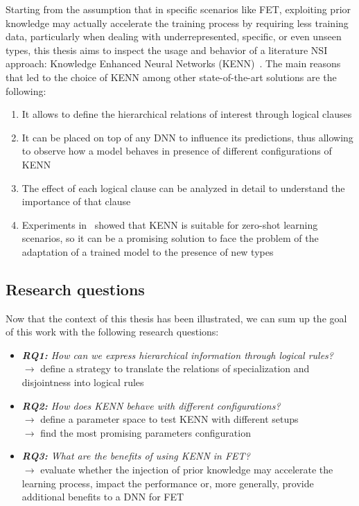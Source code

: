 Starting from the assumption that in specific scenarios like FET, exploiting prior knowledge may actually accelerate the training process by requiring less training data, particularly when dealing with underrepresented, specific, or even unseen types, this thesis aims to inspect the usage and behavior of a literature NSI approach: Knowledge Enhanced Neural Networks (KENN)~\cite{kenn}. The main reasons that led to the choice of KENN among other state-of-the-art solutions are the following:
\begin{enumerate}
    \item It allows to define the hierarchical relations of interest through logical clauses
    \item It can be placed on top of any DNN to influence its predictions, thus allowing to observe how a model behaves in presence of different configurations of KENN
    \item The effect of each logical clause can be analyzed in detail to understand the importance of that clause
    \item Experiments in~\cite{kenn, daniele2021neural} showed that KENN is suitable for zero-shot learning scenarios, so it can be a promising solution to face the problem of the adaptation of a trained model to the presence of new types
\end{enumerate}
 
\subsection{Research questions} \label{research_questions}
Now that the context of this thesis has been illustrated, we can sum up the goal of this work with the following research questions:
\begin{itemize}
    \item \textit{\textbf{RQ1: }How can we express hierarchical information through logical rules?}\\
    $\rightarrow$ define a strategy to translate the relations of specialization and disjointness into logical rules
    \item \textit{\textbf{RQ2: }How does KENN behave with different configurations?}\\
    $\rightarrow$ define a parameter space to test KENN with different setups\\
    $\rightarrow$ find the most promising parameters configuration
    \item \textit{\textbf{RQ3: }What are the benefits of using KENN in FET?}\\
    $\rightarrow$ evaluate whether the injection of prior knowledge may accelerate the learning process, impact the performance or, more generally, provide additional benefits to a DNN for FET
\end{itemize}

